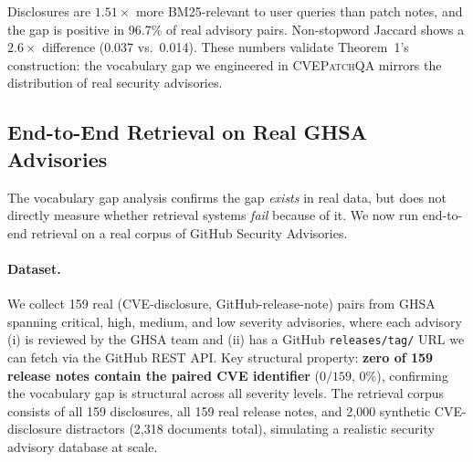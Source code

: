 \documentclass[11pt]{article}
\begin{document}
\begin{table}[h]
\centering
\small
{}
\caption{Vocabulary gap between queries and (a) vulnerability disclosures vs.\ (b) patch release notes on 120 real security advisories (GHSA + NVD). Disclosures are $1.51\times$ more BM25-relevant to the query than patch notes; 97.5\% of pairs show positive BM25 gap, 96.7\% positive Jaccard gap. The vocabulary gap is a property of natural corpora, not an artifact of our synthetic construction.}
\label{tab:vocab_gap}
\end{table}

Disclosures are $1.51\times$ more BM25-relevant to user queries than patch notes, and the gap is positive in 96.7\% of real advisory pairs. Non-stopword Jaccard shows a $2.6\times$ difference (0.037 vs.\ 0.014). These numbers validate Theorem~1's construction: the vocabulary gap we engineered in \textsc{CVEPatchQA} mirrors the distribution of real security advisories.

\subsection{End-to-End Retrieval on Real GHSA Advisories}
\label{sec:ghsa_realworld}

The vocabulary gap analysis confirms the gap \emph{exists} in real data, but does not directly measure whether retrieval systems \emph{fail} because of it. We now run end-to-end retrieval on a real corpus of GitHub Security Advisories.

\paragraph{Dataset.} We collect 159 real (CVE-disclosure, GitHub-release-note) pairs from GHSA spanning critical, high, medium, and low severity advisories, where each advisory (i) is reviewed by the GHSA team and (ii) has a GitHub \texttt{releases/tag/} URL we can fetch via the GitHub REST API. Key structural property: \textbf{zero of 159 release notes contain the paired CVE identifier} ($0/159$, $0\%$), confirming the vocabulary gap is structural across all severity levels. The retrieval corpus consists of all 159 disclosures, all 159 real release notes, and 2,000 synthetic CVE-disclosure distractors (2,318 documents total), simulating a realistic security advisory database at scale.
\end{document}
